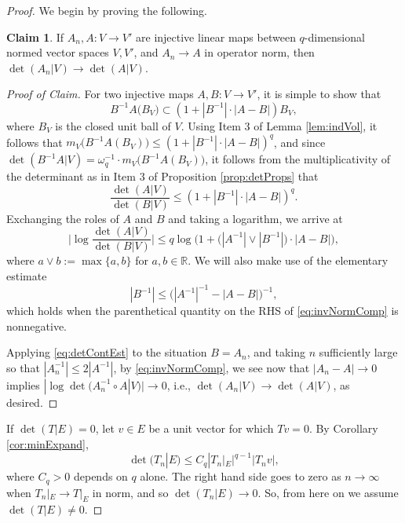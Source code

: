 \documentclass[11pt]{amsart}
\theoremstyle{theorem}
\theoremstyle{definition}
\newtheorem{cla}[thm]{Claim}
\numberwithin{equation}{section}
\newcommand{\R}{\mathbb{R}}
\begin{document}
\begin{proof}
We begin by proving the following.

\begin{cla} \label{cla:detContSingleSub}
If $A_n, A : V \to V'$ are injective linear maps between $q$-dimensional normed vector spaces $V, V'$, and $A_n \to A$ in operator norm, then $\det(A_n | V) \to \det(A | V)$.
\end{cla}
\begin{proof}[Proof of Claim]
For two injective maps $A, B : V \to V'$, it is simple to show that
\[
B^{-1} A \big( B_V \big) \subset (1 + |B^{-1}| \cdot  |A - B|) B_V,
\]
where $B_V$ is the closed unit ball of $V$. Using Item 3 of Lemma \ref{lem:indVol}, it follows that $m_V \big( B^{-1} A (B_V) \big) \leq (1 + |B^{-1}| \cdot  |A - B|)^q$, and since $\det(B^{-1} A | V) = \omega_q^{-1} \cdot m_{V} \big( B^{-1} A (B_V) \big)$, it follows from the multiplicativity of the determinant as in Item 3 of Proposition \ref{prop:detProps} that
\[
\frac{\det(A | V)}{\det(B | V)} \leq (1 + |B^{-1}| \cdot |A - B|)^q.
\]
Exchanging the roles of $A$ and $B$ and taking a logarithm, we arrive at
\begin{equation}\label{eq:detContEst}
\bigg| \log  \frac{\det(A | V)}{\det(B | V)} \bigg| \leq q \log \bigg( 1 + \big( |A^{-1}| \vee |B^{-1}| \big) \cdot |A - B| \bigg),
\end{equation}
where $a \vee b := \max \{a, b\}$ for $a,b \in \R$. We will also make use of the elementary estimate
\begin{equation}\label{eq:invNormComp}
|B^{-1}| \leq \big( |A^{-1}|^{-1} - |A - B| \big)^{-1},
\end{equation}
which holds when the parenthetical quantity on the RHS of \eqref{eq:invNormComp} is nonnegative.

Applying \eqref{eq:detContEst} to the situation $B = A_n$, and taking $n$ sufficiently large so that $|A_n^{-1}| \leq 2 |A^{-1}|$, by \eqref{eq:invNormComp}, we see now that $|A_n - A| \to 0$ implies $|\log \det(A_n^{-1} \circ A | V)| \to 0$, i.e., $\det(A_n | V) \to \det(A | V)$, as desired.
\end{proof}

 If $\det(T | E) = 0$, let $v \in E$ be a unit vector for which $T v = 0$. By Corollary \ref{cor:minExpand},
\[
\det(T_n | E) \leq C_q |T_n|_E|^{q-1} |T_n v|,
\]
where $C_q > 0$ depends on $q$ alone. The right hand side goes to zero as $n \to \infty$ when $T_n|_E \to T|_E$ in norm, and so $\det(T_n | E) \to 0$. So, from here on we assume $\det(T|E) \neq 0$.




\end{proof}
\end{document}
